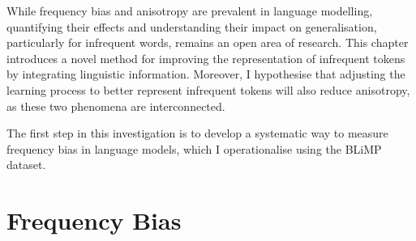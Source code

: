 
\vspace{1em}

While frequency bias and anisotropy are prevalent in language modelling, quantifying their effects and understanding their impact on generalisation, particularly for infrequent words, remains an open area of research. This chapter introduces a novel method for improving the representation of infrequent tokens by integrating linguistic information. Moreover, I hypothesise that adjusting the learning process to better represent infrequent tokens will also reduce anisotropy, as these two phenomena are interconnected.

The first step in this investigation is to develop a systematic way to measure frequency bias in language models, which I operationalise using the BLiMP dataset.

\section{Frequency Bias}
\label{sec:freq-bias}


